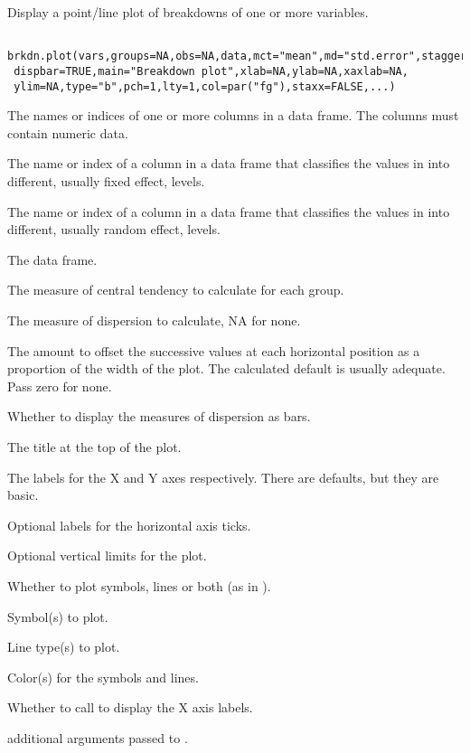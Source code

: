 \begin{Description}\relax
Display a point/line plot of breakdowns of one or more variables.
\end{Description}
\begin{Usage}
\begin{verbatim}
 brkdn.plot(vars,groups=NA,obs=NA,data,mct="mean",md="std.error",stagger=NA,
 dispbar=TRUE,main="Breakdown plot",xlab=NA,ylab=NA,xaxlab=NA,
 ylim=NA,type="b",pch=1,lty=1,col=par("fg"),staxx=FALSE,...)
\end{verbatim}
\end{Usage}
\begin{Arguments}
\begin{ldescription}
\item[\code{vars}] The names or indices of one or more columns in a data frame.
The columns must contain numeric data.
\item[\code{groups}] The name or index of a column in a data frame that classifies
the values in  into different, usually fixed effect, levels.
\item[\code{obs}] The name or index of a column in a data frame that classifies
the values in  into different, usually random effect, levels.
\item[\code{data}] The data frame.
\item[\code{mct}] The measure of central tendency to calculate for each group.
\item[\code{md}] The measure of dispersion to calculate, NA for none.
\item[\code{stagger}] The amount to offset the successive values at each horizontal
position as a proportion of the width of the plot. The calculated default
is usually adequate. Pass zero for none.
\item[\code{dispbar}] Whether to display the measures of dispersion as bars.
\item[\code{main}] The title at the top of the plot.
\item[\code{xlab,ylab}] The labels for the X and Y axes respectively. There are
defaults, but they are basic.
\item[\code{xaxlab}] Optional labels for the horizontal axis ticks.
\item[\code{ylim}] Optional vertical limits for the plot.
\item[\code{type}] Whether to plot symbols, lines or both (as in ).
\item[\code{pch}] Symbol(s) to plot.
\item[\code{lty}] Line type(s) to plot.
\item[\code{col}] Color(s) for the symbols and lines.
\item[\code{staxx}] Whether to call  to display the X axis
labels.
\item[\code{...}] additional arguments passed to .
\end{ldescription}
\end{Arguments}
